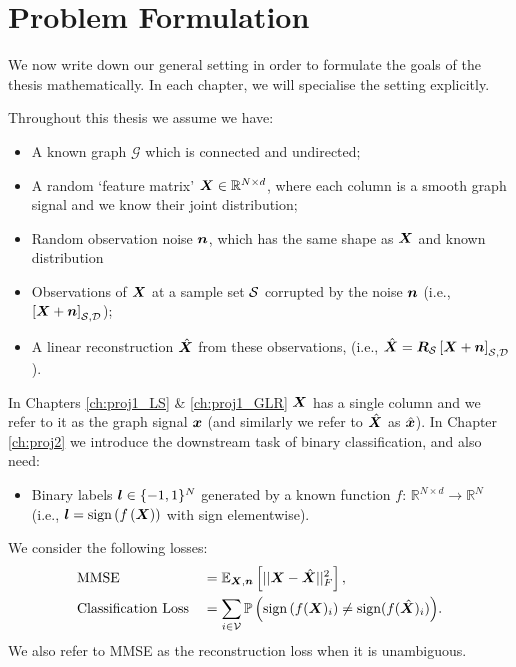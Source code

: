 \section{Problem Formulation}
\label{sec:thesis_define_MMSE}
We now write down our general setting in order to formulate the goals of the thesis mathematically. In each chapter, we will specialise the setting explicitly. 

Throughout this thesis we assume we have:
\begin{itemize}
    \item A known graph $\mathcal{G}$ which is connected and undirected;
    \item A random `feature matrix' $\bm{X}\in\mathbb{R}^{N \times d}$, where each column is a smooth graph signal and we know their joint distribution;
    \item Random observation noise $\bm{n}$, which has the same shape as $\bm{X}$ and known distribution
    \item Observations of $\bm{X}$ at a sample set $\mathcal{S}$ corrupted by the noise $\bm{n}$ (i.e., $\msubgen[\set{S},\set{D}]{\matr{X} + \vect{n}}$);
    \item A linear reconstruction $\hat{\bm{X}}$ from these observations, (i.e., $\hat{\matr{X}} = \matr{R}_{\set{S}} \msubgen[\set{S},\set{D}]{\matr{X} + \vect{n}}$).
\end{itemize}
In Chapters \ref{ch:proj1_LS} \& \ref{ch:proj1_GLR} $\bm{X}$ has a single column and we refer to it as the graph signal $\bm{x}$ (and similarly we refer to $\hat{\bm{X}}$ as $\hat{\bm{x}}$). 
In Chapter \ref{ch:proj2} we  introduce the downstream task of binary classification, and also need:
\begin{itemize}
    \item Binary labels $\bm{l} \in \{-1,1\}^{N}$ generated by a known function $f:\, \mathbb{R}^{N \times d}\to \mathbb{R}^{N}$  (i.e., $\bm{l} = \text{sign}\left(f\left(\bm{X}\right)\right)$ with sign elementwise).
\end{itemize}
We consider the following losses:
\begin{align}
    &\text{MMSE} &&= \expect[\matr{X}, \vect{n}]{||{\vect{X} - \hat{\vect{X}}}||^{2}_{F}},\\
    &{\text{Classification Loss}} &&= {\sum_{i \in \set{V}}\prob{\text{sign}\left(f(\matr{X})_{i}\right) \neq \text{sign}(f(\hat{\matr{X}})_{i})}}.
\end{align}
We also refer to MMSE as the reconstruction loss when it is unambiguous. 

